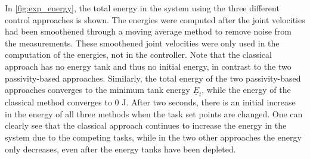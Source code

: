 \documentclass[../main.tex]{subfiles}
\begin{document}
In \cref{fig:exp_energy}, the total energy in the system using the three different control approaches is shown. The energies were computed after the joint velocities had been smoothened through a moving average method to remove noise from the measurements. These smoothened joint velocities were only used in the computation of the energies, not in the controller. Note that the classical approach has no energy tank and thus no initial energy, in contrast to the two passivity-based approaches. 
Similarly, the total energy of the two passivity-based approaches converges to the minimum tank energy $\underline{E}_t$, while the energy of the classical method converges to $0$
J. 
After two seconds, there is an initial increase in the energy of all three methods when the task set points are changed. One can clearly see that the classical approach continues to increase the energy in the system due to the competing tasks, while in the two other approaches the energy only decreases, even after the energy tanks have been depleted. 



\end{document}
